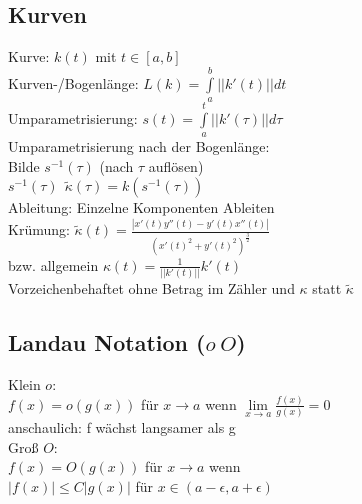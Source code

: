 \documentclass[6pt,a4paper]{scrartcl}
\newcommand{\enbrace}[1]{\ensuremath{\left(#1\right)}}
\begin{document}
\begin{multicols}{4}
\subsection{Kurven}
Kurve: $k(t)$ mit $t \in [a,b]$\\
Kurven-/Bogenlänge: $L(k)=\int\limits_a^b ||k'(t)|| dt$ \\
Umparametrisierung: $s(t)=\int\limits_a^t || k'(\tau) || d\tau$ \\
Umparametrisierung nach der Bogenlänge: \\ 
Bilde $s^{-1}(\tau)$ (nach $\tau$ auflösen) \\
$s^{-1}(\tau) ~~ \tilde\kappa(\tau)=k\enbrace{s^{-1}(\tau)} $ \\
Ableitung: Einzelne Komponenten Ableiten\\
Krümung: $\tilde\kappa(t) = \frac{|x'(t)y''(t)-y'(t)x''(t)|}{(x'(t)^2+y'(t)^2)^\frac{3}{2}}$ \\
bzw. allgemein $\kappa(t)=\frac{1}{||k'(t)||} k'(t)$ \\
Vorzeichenbehaftet ohne Betrag im Zähler und $\kappa$ statt $\tilde\kappa$

\subsection{Landau Notation ($o~O$)}
Klein $o$: \\
$f(x)=o(g(x))$ für $x \rightarrow a$ wenn $\lim\limits_{x\rightarrow a}\frac{f(x)}{g(x)}=0$ \\
anschaulich: f wächst langsamer als g \\
Groß $O$: \\
$f(x)=O(g(x))$ für $x \rightarrow a$ wenn \\
$|f(x)| \leq C|g(x)|$ für $x \in (a-\epsilon, a+\epsilon)$


\end{multicols}
\end{document}
